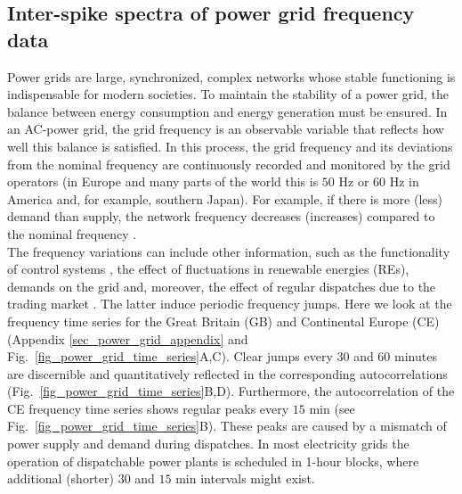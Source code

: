 \documentclass[entropy,article,submit,pdftex,moreauthors]{Definitions/mdpi}
\begin{document}
\subsection{Inter-spike spectra of power grid frequency data}

Power grids are large, synchronized, complex networks whose stable functioning is indispensable for modern societies.
To maintain the stability of a power grid, the balance between energy consumption and energy generation must be ensured. 
In an AC-power grid, the grid frequency is an observable variable that reflects how well this balance is satisfied. 
In this process, the grid frequency and its deviations from the nominal frequency are continuously recorded and monitored by 
the grid operators (in Europe and many parts of the world this is $50$ \si{Hz} or $60$ \si{Hz} in America and, for example, southern Japan).
For example, if there is more (less) demand than supply, the network frequency decreases (increases) compared to the nominal frequency \cite{kundur1994power}.
\\
The frequency variations can include other information, such as the functionality of control systems \cite{gorjao2020data}, the effect of fluctuations in
renewable energies (REs), demands on the grid \cite{anvari2020stochastic} and, moreover, the effect of regular dispatches due to the trading market 
\cite{meyer2020identifying}. The latter induce periodic frequency jumps. Here we look at the frequency time series for the Great Britain (GB) and Continental Europe 
(CE) (Appendix \ref{sec_power_grid_appendix} and Fig.~\ref{fig_power_grid_time_series}A,C). Clear jumps every 30 and 60 minutes are discernible and quantitatively reflected in the corresponding 
autocorrelations (Fig.~\ref{fig_power_grid_time_series}B,D). Furthermore, the autocorrelation of the CE frequency time series shows regular peaks every $15$ \si{min} 
(see Fig.~\ref{fig_power_grid_time_series}B). These peaks are caused by a mismatch of power supply and demand \cite{weissbach2009high} during dispatches. 
In most electricity grids the operation of dispatchable power plants is scheduled in 1-hour blocks, where additional (shorter) $30$ and $15$ \si{min} intervals
might exist.\\
\end{document}
